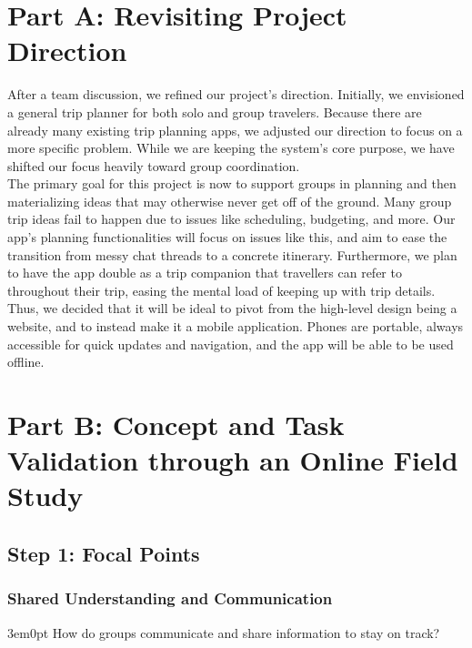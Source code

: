 \documentclass[12pt,a4paper]{article}
\begin{document}

\newpage
{}   
\tableofcontents
\newpage
{} 

\section{Part A: Revisiting Project Direction}
 After a team discussion, we refined our project’s direction. Initially, we envisioned a general trip planner for both solo and group travelers. Because there are already many existing trip planning apps, we adjusted our direction to focus on a more specific problem. While we are keeping the system's core purpose, we have shifted our focus heavily toward group coordination.
\\

 The primary goal for this project is now to support groups in planning and then materializing ideas that may otherwise never get off of the ground. Many group trip ideas fail to happen due to issues like scheduling, budgeting, and more. Our app’s planning functionalities will focus on issues like this, and aim to ease the transition from messy chat threads to a concrete itinerary. Furthermore, we plan to have the app double as a trip companion that travellers can refer to throughout their trip, easing the mental load of keeping up with trip details. Thus, we decided that it will be ideal to pivot from the high-level design being a website, and to instead make it a mobile application. Phones are portable, always accessible for quick updates and navigation, and the app will be able to be used offline.


\newpage
\section{Part B: Concept and Task Validation through an Online Field Study}

\subsection{Step 1: Focal Points}

\subsubsection{Shared Understanding and Communication}

\begin{adjustwidth}{3em}{0pt}
How do groups communicate and share information to stay on track?
\end{adjustwidth}
\end{document}
